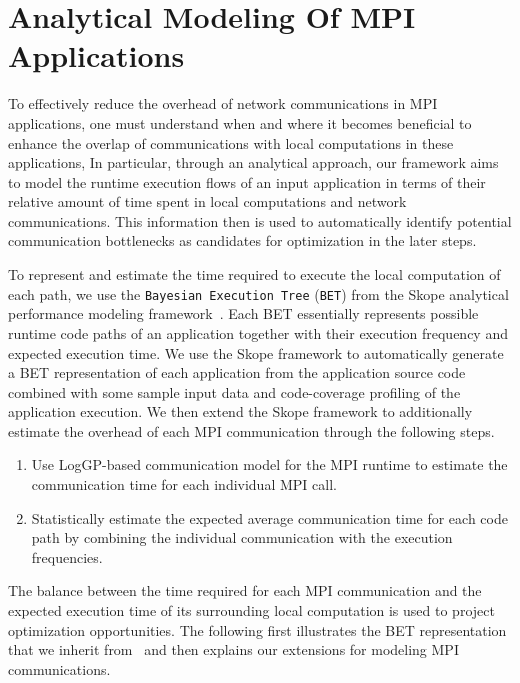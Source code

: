 \section{Analytical Modeling Of MPI Applications}
\label{sec-model}

To effectively reduce the overhead of network communications in MPI
applications, one must understand when and where it becomes beneficial
to enhance the overlap of communications with local computations in
these applications, In particular, through an analytical approach, our
framework aims to model the runtime execution flows of an input
application in terms of their relative amount of time spent in local
computations and network communications.  This information then is
used to automatically identify potential communication bottlenecks as
candidates for optimization in the later steps.

To represent and estimate the time required to execute the local computation of
each path, we use the \texttt{Bayesian Execution Tree} (\texttt{BET})
from the Skope analytical performance modeling
framework~\cite{jichi:ipdps14}.  Each BET essentially represents
possible runtime code paths of an application together with their
execution frequency and expected execution time. We use the Skope
framework to automatically generate a BET representation of each
application from the application source code combined with some sample
input data and code-coverage profiling of the application execution.
We then extend the Skope framework to additionally estimate the
overhead of each MPI communication through the following steps.

\begin{enumerate}

\item Use LogGP-based communication model for the MPI runtime to
  estimate the communication time for each individual MPI call.

\item Statistically estimate the expected average communication time
  for each code path by combining the individual communication with
  the execution frequencies.

\end{enumerate}

The balance between the time required for each MPI communication and
the expected execution time of its surrounding local computation is
used to project optimization opportunities. The following first
illustrates the BET representation that we inherit
from~\cite{jichi:ipdps14} and then explains our extensions for
modeling MPI communications.


